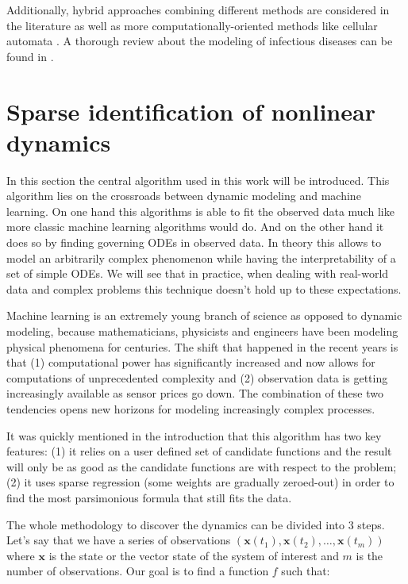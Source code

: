 \documentclass[12pt, letterpaper]{article}
\begin{document}
Additionally, hybrid approaches combining different methods are considered in the literature \cite{} as well as more computationally-oriented methods like cellular automata \cite{}. A thorough review about the modeling of infectious diseases can be found in \cite{}.

\section{Sparse identification of nonlinear dynamics}\label{sec:sindy}

In this section the central algorithm used in this work will be introduced. This algorithm lies on the crossroads between dynamic modeling and machine learning. On one hand this algorithms is able to fit the observed data much like more classic machine learning algorithms would do. And on the other hand it does so by finding governing ODEs in observed data. In theory this allows to model an arbitrarily complex phenomenon while having the interpretability of a set of simple ODEs. We will see that in practice, when dealing with real-world data and complex problems this technique doesn't hold up to these expectations.

Machine learning is an extremely young branch of science as opposed to dynamic modeling, because mathematicians, physicists and engineers have been modeling physical phenomena for centuries. The shift that happened in the recent years is that (1) computational power has significantly increased and now allows for computations of unprecedented complexity and (2) observation data is getting increasingly available as sensor prices go down. The combination of these two tendencies opens new horizons for modeling increasingly complex processes.  


It was quickly mentioned in the introduction that this algorithm has two key features: (1) it relies on a user defined set of candidate functions and the result will only be as good as the candidate functions are with respect to the problem; (2) it uses sparse regression (some weights are gradually zeroed-out) in order to find the most parsimonious formula that still fits the data.

The whole methodology to discover the dynamics can be divided into 3 steps. Let's say that we have a series of observations $(\mathbf{x}(t_1), \mathbf{x}(t_2), \dots, \mathbf{x}(t_m))$ where $\mathbf{x}$ is the state or the vector state of the system of interest and $m$ is the number of observations. Our goal is to find a function $f$ such that:
\end{document}
